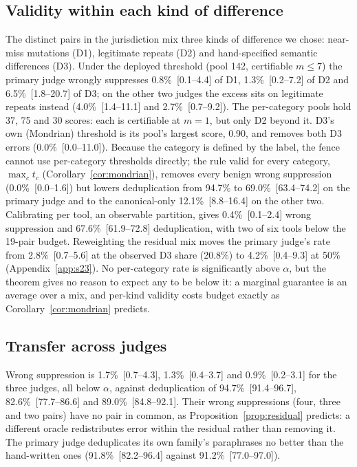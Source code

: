 

\subsection{Validity within each kind of difference}\label{sec:res-class}

The distinct pairs in the jurisdiction mix three kinds of difference we chose: near-miss mutations (D1), legitimate repeats (D2) and hand-specified semantic differences (D3). Under the deployed threshold (pool 142, certifiable $m\le7$) the primary judge wrongly suppresses 0.8\%~[0.1--4.4] of D1, 1.3\%~[0.2--7.2] of D2 and 6.5\%~[1.8--20.7] of D3; on the other two judges the excess sits on legitimate repeats instead (4.0\%~[1.4--11.1] and 2.7\%~[0.7--9.2]). The per-category pools hold 37, 75 and 30 scores: each is certifiable at $m=1$, but only D2 beyond it. D3's own (Mondrian) threshold is its pool's largest score, 0.90, and removes both D3 errors (0.0\%~[0.0--11.0]). Because the category is defined by the label, the fence cannot use per-category thresholds directly; the rule valid for every category, $\max_ct_c$ (Corollary~\ref{cor:mondrian}), removes every benign wrong suppression (0.0\%~[0.0--1.6]) but lowers deduplication from 94.7\% to 69.0\%~[63.4--74.2] on the primary judge and to the canonical-only 12.1\%~[8.8--16.4] on the other two. Calibrating per tool, an observable partition, gives 0.4\%~[0.1--2.4] wrong suppression and 67.6\%~[61.9--72.8] deduplication, with two of six tools below the 19-pair budget. Reweighting the residual mix moves the primary judge's rate from 2.8\%~[0.7--5.6] at the observed D3 share (20.8\%) to 4.2\%~[0.4--9.3] at 50\% (Appendix~\ref{app:s23}). No per-category rate is significantly above $\alpha$, but the theorem gives no reason to expect any to be below it: a marginal guarantee is an average over a mix, and per-kind validity costs budget exactly as Corollary~\ref{cor:mondrian} predicts.

\subsection{Transfer across judges}\label{sec:res-judges}

Wrong suppression is 1.7\%~[0.7--4.3], 1.3\%~[0.4--3.7] and 0.9\%~[0.2--3.1] for the three judges, all below $\alpha$, against deduplication of 94.7\%~[91.4--96.7], 82.6\%~[77.7--86.6] and 89.0\%~[84.8--92.1]. Their wrong suppressions (four, three and two pairs) have no pair in common, as Proposition~\ref{prop:residual} predicts: a different oracle redistributes error within the residual rather than removing it. The primary judge deduplicates its own family's paraphrases no better than the hand-written ones (91.8\%~[82.2--96.4] against 91.2\%~[77.0--97.0]).

